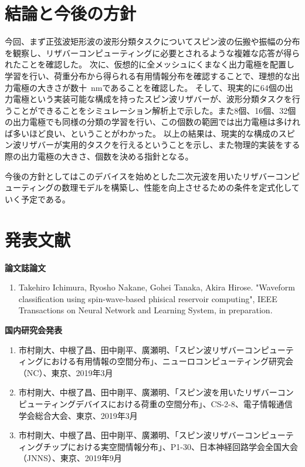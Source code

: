 \documentclass[a4j, twocolumn]{jsarticle}
\begin{document}
\section{結論と今後の方針}
\label{sec:conclusion}
今回、まず正弦波矩形波の波形分類タスクについてスピン波の伝搬や振幅の分布を観察し、リザバーコンピューティングに必要とされるような複雑な応答が得られたことを確認した。
次に、仮想的に全メッシュにくまなく出力電極を配置し学習を行い、荷重分布から得られる有用情報分布を確認することで、理想的な出力電極の大きさが数十~nmであることを確認した。
そして、現実的に64個の出力電極という実装可能な構成を持ったスピン波リザバーが、波形分類タスクを行うことができることをシミュレーション解析上で示した。また8個、16個、32個の出力電極でも同様の分類の学習を行い、この個数の範囲では出力電極は多ければ多いほど良い、ということがわかった。
以上の結果は、現実的な構成のスピン波リザバーが実用的タスクを行えるということを示し、また物理的実装をする際の出力電極の大きさ、個数を決める指針となる。

今後の方針としてはこのデバイスを始めとした二次元波を用いたリザバーコンピューティングの数理モデルを構築し、性能を向上させるための条件を定式化していく予定である。





\section*{発表文献}
{\bf 論文誌論文}
\begin{enumerate}
\item Takehiro Ichimura, Ryosho Nakane, Gohei Tanaka, Akira Hirose. "Waveform classification using spin-wave-based phisical reservoir computing", IEEE Transactions on Neural Network and Learning System, in preparation.
\end{enumerate}


{\bf 国内研究会発表}
\begin{enumerate}
\item 市村剛大、中根了昌、田中剛平、廣瀬明、「スピン波リザバーコンピューティングにおける有用情報の空間分布」、ニューロコンピューティング研究会（NC）、東京、2019年3月
\item 市村剛大、中根了昌、田中剛平、廣瀬明、「スピン波を用いたリザバーコンピューティングデバイスにおける荷重の空間分布」、CS-2-8、電子情報通信学会総合大会、東京、2019年3月
\item 市村剛大、中根了昌、田中剛平、廣瀬明、「スピン波リザバーコンピューティングチップにおける実空間情報分布」、P1-30、日本神経回路学会全国大会（JNNS）、東京、2019年9月
\end{enumerate}
\end{document}
